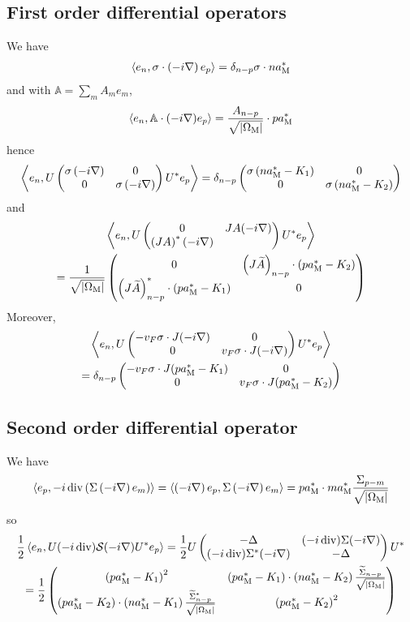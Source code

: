 \documentclass[11pt,a4paper,reqno,french,tikz]{amsart}
\newcommand{\pa}[1]{\left( #1 \right)} %
\newcommand{\ab}[1]{\left|#1\right|} %
\newcommand{\ps}[1]{\left< #1 \right>} %
\newcommand{\na}{\nabla} %
\newcommand{\f}[2]{\frac{#1}{#2}} %
\newcommand{\ind}[1]{_{\textup{#1}}} %
\newcommand{\mat}[1]{\begin{pmatrix} #1 \end{pmatrix}} %
\def\bbA{{\mathbb A}}
\newcommand{\sqom}{\sqrt{\ab{\Omega\ind{M}}}}
\begin{document}
\subsection{First order differential operators}%
\label{sub:First order differential operators}
We have
\begin{align*}
\ps{e_n, \sigma \cdot \pa{-i\na} e_p} = \delta_{n-p} \sigma \cdot n a\ind{M}^*
\end{align*}
and with $\bbA = \sum_m A_m e_m$,
\begin{align*}
\ps{e_n,\bbA \cdot (-i\na) e_p} = \f{A_{n-p}}{\sqom} \cdot p  a\ind{M}^*
\end{align*}
hence
\begin{align*}
\ps{e_n,U \mat{\sigma \pa{-i\na} & 0 \\ 0 & \sigma \pa{-i\na}} U^* e_p} = \delta_{n-p} \mat{\sigma \pa{n a\ind{M}^* -  K_1} & 0 \\ 0 & \sigma \pa{n a\ind{M}^*- K_2}} 
\end{align*}
and
\begin{multline*}
	\ps{e_n,U \mat{0 & JA (-i\na) \\ \pa{JA}^* (-i\na)} U^* e_p} \\
= \f{1}{\sqom}\mat{0 & \pa{J \widetilde{A}}_{n-p} \cdot(p  a\ind{M}^* - K_2) \\  \pa{J \widetilde{A}}^*_{n-p} \cdot(p a\ind{M}^* -  K_1) & 0}
\end{multline*}
Moreover,
\begin{multline*}
	\ps{e_n,U  \mat{- v_F \sigma\cdot J(-i\na) & 0 \\ 0 & v_F \sigma\cdot J(-i\na)} U^* e_p}  \\
=  \delta_{n-p}\mat{- v_F \sigma\cdot J(p a\ind{M}^* -  K_1) & 0 \\ 0 & v_F \sigma\cdot J(p a\ind{M}^* - K_2)}
\end{multline*}


\subsection{Second order differential operator}%
\label{sub:Second order differential operator}

We have
\begin{align*}
\ps{e_p, -i\div \pa{\Sigma \pa{-i\na} e_m}} = \ps{\pa{-i\na} e_p,\Sigma \pa{-i\na} e_m} = p a\ind{M}^* \cdot m a\ind{M}^* \f{\Sigma_{p-m}}{\sqom}
\end{align*}
so
\begin{multline*}
\f 12 \ps{e_n, U(-i\div ) \cS (-i\na) U^*e_p} = \f 12 U \mat{-\Delta & (-i \div) \Sigma (-i\na) \\ (-i \div) \Sigma^* (-i\na) & -\Delta} U^*  \\
= \f{1}{2} \mat{\pa{p a\ind{M}^* - K_1}^2 &\pa{p a\ind{M}^* -  K_1} \cdot \pa{n a\ind{M}^* - K_2} \f{\widetilde{\Sigma}_{n-p}}{\sqom}  \\ \pa{p a\ind{M}^* - K_2}\cdot\pa{n a\ind{M}^* -  K_1} \f{\widetilde{\Sigma}^*_{n-p}}{\sqom}  & \pa{p a\ind{M}^* - K_2}^2}
\end{multline*}
\end{document}
